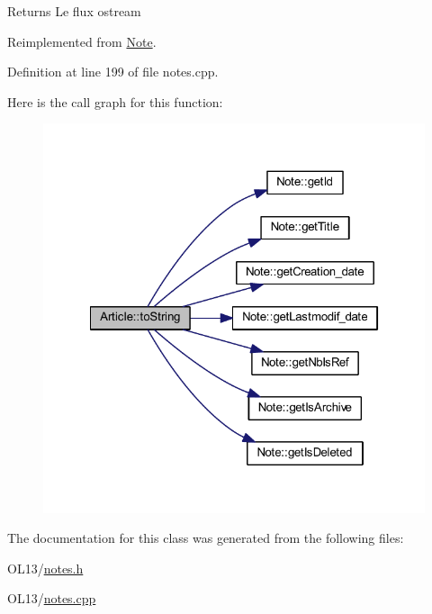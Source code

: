 \begin{DoxyReturn}{Returns}
Le flux ostream 
\end{DoxyReturn}


Reimplemented from \hyperlink{class_note_a1bd4acfbde0b71d05fd7d4ca889bca2b}{Note}.



Definition at line 199 of file notes.\+cpp.

Here is the call graph for this function\+:\nopagebreak
\begin{figure}[H]
\begin{center}
\leavevmode
\includegraphics[width=322pt]{class_article_ae40d268ecffbaaa549968a81ea609ba4_cgraph}
\end{center}
\end{figure}


The documentation for this class was generated from the following files\+:\begin{DoxyCompactItemize}
\item 
O\+L13/\hyperlink{notes_8h}{notes.\+h}\item 
O\+L13/\hyperlink{notes_8cpp}{notes.\+cpp}\end{DoxyCompactItemize}

